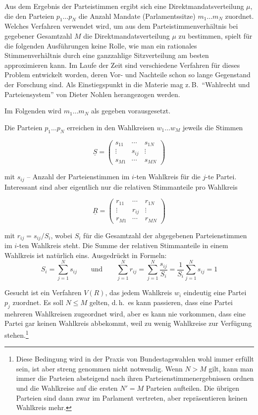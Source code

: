 Aus dem Ergebnis der Parteistimmen ergibt sich eine Direktmandatsverteilung $\mu$, die den
Parteien $p_1 \ldots p_N$ die Anzahl Mandate (Parlamentssitze) $m_1 \ldots m_N$ zuordnet.
Welches Verfahren verwendet wird, um aus dem Parteistimmenverhältnis bei gegebener Gesamtzahl $M$
die Direktmandatsverteilung $\mu$ zu bestimmen, spielt für die folgenden Ausführungen keine Rolle,
wie man ein rationales Stimmenverhältnis durch eine ganzzahlige Sitzverteilung am besten
approximieren kann. Im Laufe der Zeit sind verschiedene Verfahren für dieses Problem entwickelt
worden, deren Vor- und Nachteile schon so lange Gegenstand der Forschung sind. Als Einstiegspunkt
in die Materie mag z.\,B.\ \enquote{Wahlrecht und Parteiensystem} von Dieter Nohlen herangezogen
werden.

Im Folgenden wird $m_1 \ldots m_N$ als gegeben vorausgesetzt.

Die Parteien $p_1 \ldots p_N$ erreichen in den Wahlkreisen $w_1 \ldots w_M$ jeweils die Stimmen

\[
  \underline{S} = \begin{pmatrix}
    s_{11} & \cdots & s_{1N} \\
    \vdots & s_{ij} & \vdots \\
    s_{M1} & \cdots & s_{MN}
  \end{pmatrix}
\]

mit $s_{ij}$ -- Anzahl der Parteienstimmen im $i$-ten Wahlkreis für die $j$-te Partei.
Interessant sind aber eigentlich nur die relativen Stimmanteile pro Wahlkreis

\[
  \underline{R} = \begin{pmatrix}
    r_{11} & \cdots & r_{1N} \\
    \vdots & r_{ij} & \vdots \\
    r_{M1} & \cdots & r_{MN}
  \end{pmatrix}
\]

mit $r_{ij} = s_{ij}/S_i$, wobei $S_i$ für die Gesamtzahl der abgegebenen Parteienstimmen im
$i$-ten Wahlkreis steht. Die Summe der relativen Stimmanteile in einem Wahlkreis ist natürlich
eins. Ausgedrückt in Formeln:
\[
  S_i = \sum_{j=1}^{N} s_{ij}
  \qquad \text{und} \qquad
  \sum_{j=1}^{N} r_{ij} = \sum_{j=1}^{N} \frac{s_{ij}}{S_i}
    = \frac{1}{S_i}\sum_{j=1}^{N} s_{ij} = 1
\]

Gesucht ist ein Verfahren $V(R)$, das jedem Wahlkreis $w_i$ eindeutig eine Partei $p_j$ zuordnet.
Es soll $N \leq M$ gelten, d.\,h.\ es kann passieren, dass eine Partei mehreren Wahlkreisen
zugeordnet wird, aber es kann nie vorkommen, dass eine Partei gar keinen Wahlkreis abbekommt,
weil zu wenig Wahlkreise zur Verfügung stehen.\footnote{Diese Bedingung wird in der Praxis von
Bundestagswahlen wohl immer erfüllt sein, ist aber streng genommen nicht notwendig. Wenn $N > M$
gilt, kann man immer die Parteien absteigend nach ihren Parteienstimmenergebnissen ordnen und die
Wahlkreise auf die ersten $N' = M$ Parteien aufteilen. Die übrigen Parteien sind dann zwar im
Parlament vertreten, aber repräsentieren keinen Wahlkreis mehr.}

